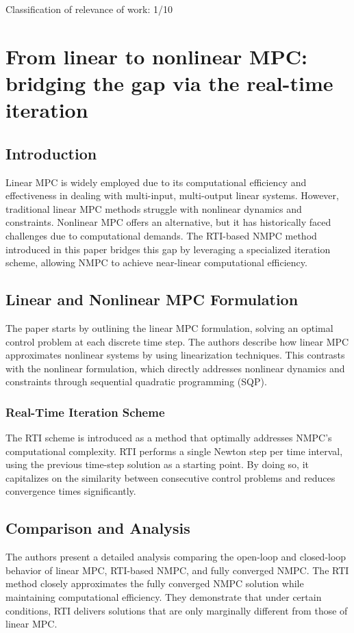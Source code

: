 \documentclass[a4paper,12pt]{article}
\begin{document}
Classification of relevance of work: 1/10

\section{From linear to nonlinear MPC: bridging the gap via
  the real-time iteration}

\subsection{Introduction}
Linear MPC is widely employed due to its computational efficiency and effectiveness in dealing with multi-input, multi-output linear systems. However, traditional linear MPC methods struggle with nonlinear dynamics and constraints. Nonlinear MPC offers an alternative, but it has historically faced challenges due to computational demands. The RTI-based NMPC method introduced in this paper bridges this gap by leveraging a specialized iteration scheme, allowing NMPC to achieve near-linear computational efficiency.

\subsection{Linear and Nonlinear MPC Formulation}
The paper starts by outlining the linear MPC formulation, solving an optimal control problem at each discrete time step. The authors describe how linear MPC approximates nonlinear systems by using linearization techniques. This contrasts with the nonlinear formulation, which directly addresses nonlinear dynamics and constraints through sequential quadratic programming (SQP).

\subsubsection{Real-Time Iteration Scheme}
The RTI scheme is introduced as a method that optimally addresses NMPC’s computational complexity. RTI performs a single Newton step per time interval, using the previous time-step solution as a starting point. By doing so, it capitalizes on the similarity between consecutive control problems and reduces convergence times significantly.

\subsection{Comparison and Analysis}
The authors present a detailed analysis comparing the open-loop and closed-loop behavior of linear MPC, RTI-based NMPC, and fully converged NMPC. The RTI method closely approximates the fully converged NMPC solution while maintaining computational efficiency. They demonstrate that under certain conditions, RTI delivers solutions that are only marginally different from those of linear MPC.
\end{document}
